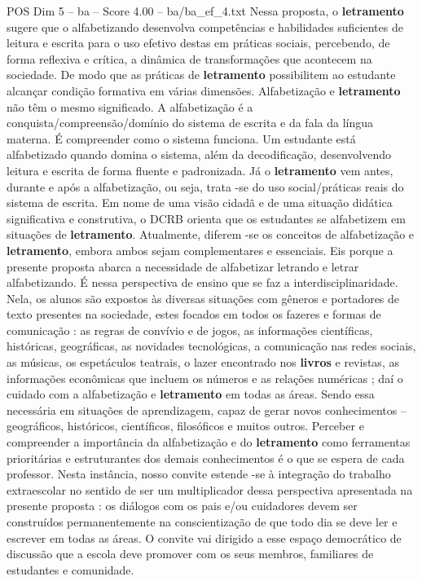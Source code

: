\begin{textsample}{POS Dim 5 – ba – Score 4.00 – ba/ba\_ef\_4.txt}
Nessa proposta, o \textbf{letramento} sugere que o alfabetizando desenvolva competências e habilidades suficientes de leitura e escrita para o uso efetivo destas em práticas sociais, percebendo, de forma reflexiva e crítica, a dinâmica de transformações que acontecem na sociedade.
De modo que as práticas de \textbf{letramento} possibilitem ao estudante alcançar condição formativa em várias dimensões.
Alfabetização e \textbf{letramento} não têm o mesmo significado.
A alfabetização é a conquista/compreensão/domínio do sistema de escrita e da fala da língua materna.
É compreender como o sistema funciona.
Um estudante está alfabetizado quando domina o sistema, além da decodificação, desenvolvendo leitura e escrita de forma fluente e padronizada.
Já o \textbf{letramento} vem antes, durante e após a alfabetização, ou seja, trata -se do uso social/práticas reais do sistema de escrita.
Em nome de uma visão cidadã e de uma situação didática significativa e construtiva, o DCRB orienta que os estudantes se alfabetizem em situações de \textbf{letramento}.
Atualmente, diferem -se os conceitos de alfabetização e \textbf{letramento}, embora ambos sejam complementares e essenciais.
Eis porque a presente proposta abarca a necessidade de alfabetizar letrando e letrar alfabetizando.
É nessa perspectiva de ensino que se faz a interdisciplinaridade.
Nela, os alunos são expostos às diversas situações com gêneros e portadores de texto presentes na sociedade, estes focados em todos os fazeres e formas de comunicação : as regras de convívio e de jogos, as informações científicas, históricas, geográficas, as novidades tecnológicas, a comunicação nas redes sociais, as músicas, os espetáculos teatrais, o lazer encontrado nos \textbf{livros} e revistas, as informações econômicas que incluem os números e as relações numéricas ; daí o cuidado com a alfabetização e \textbf{letramento} em todas as áreas.
Sendo essa necessária em situações de aprendizagem, capaz de gerar novos conhecimentos – geográficos, históricos, científicos, filosóficos e muitos outros.
Perceber e compreender a importância da alfabetização e do \textbf{letramento} como ferramentas prioritárias e estruturantes dos demais conhecimentos é o que se espera de cada professor.
Nesta instância, nosso convite estende -se à integração do trabalho extraescolar no sentido de ser um multiplicador dessa perspectiva apresentada na presente proposta : os diálogos com os pais e/ou cuidadores devem ser construídos permanentemente na conscientização de que todo dia se deve ler e escrever em todas as áreas.
O convite vai dirigido a esse espaço democrático de discussão que a escola deve promover com os seus membros, familiares de estudantes e comunidade.

\end{textsample}
